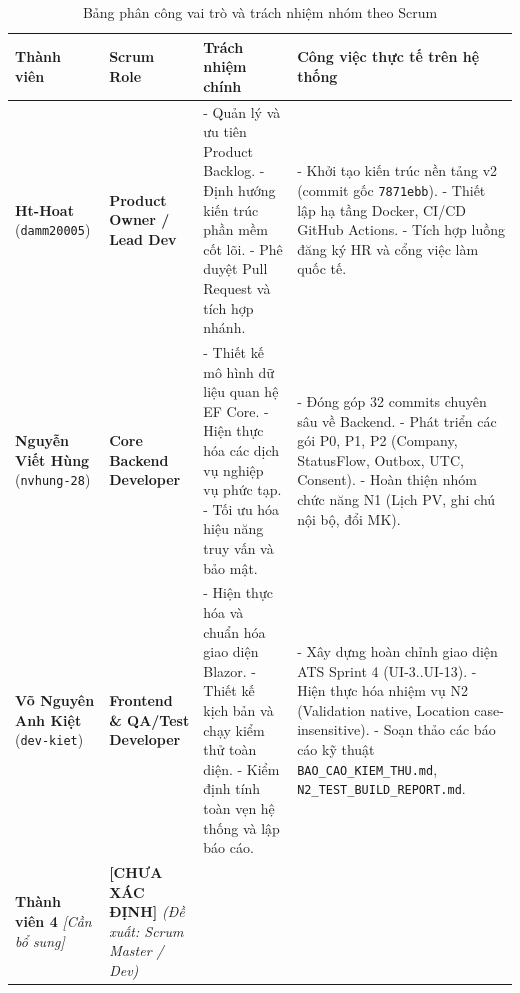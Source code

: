 \begin{table}[htbp]
\centering
\small
\caption{Bảng phân công vai trò và trách nhiệm nhóm theo Scrum}
\label{tab:scrum-roles}
\begin{tabularx}{\textwidth}{p{3.2cm} p{2.8cm} X X}
\toprule
\textbf{Thành viên} & \textbf{Scrum Role} & \textbf{Trách nhiệm chính} & \textbf{Công việc thực tế trên hệ thống} \\
\midrule
\textbf{Ht-Hoat} \newline (\texttt{damm20005}) & \textbf{Product Owner / Lead Dev} & 
- Quản lý và ưu tiên Product Backlog.\newline
- Định hướng kiến trúc phần mềm cốt lõi.\newline
- Phê duyệt Pull Request và tích hợp nhánh. &
- Khởi tạo kiến trúc nền tảng v2 (commit gốc \texttt{7871ebb}).\newline
- Thiết lập hạ tầng Docker, CI/CD GitHub Actions.\newline
- Tích hợp luồng đăng ký HR và cổng việc làm quốc tế. \\
\addlinespace
\textbf{Nguyễn Viết Hùng} \newline (\texttt{nvhung-28}) & \textbf{Core Backend Developer} &
- Thiết kế mô hình dữ liệu quan hệ EF Core.\newline
- Hiện thực hóa các dịch vụ nghiệp vụ phức tạp.\newline
- Tối ưu hóa hiệu năng truy vấn và bảo mật. &
- Đóng góp 32 commits chuyên sâu về Backend.\newline
- Phát triển các gói P0, P1, P2 (Company, StatusFlow, Outbox, UTC, Consent).\newline
- Hoàn thiện nhóm chức năng N1 (Lịch PV, ghi chú nội bộ, đổi MK). \\
\addlinespace
\textbf{Võ Nguyên Anh Kiệt} \newline (\texttt{dev-kiet}) & \textbf{Frontend \& QA/Test Developer} &
- Hiện thực hóa và chuẩn hóa giao diện Blazor.\newline
- Thiết kế kịch bản và chạy kiểm thử toàn diện.\newline
- Kiểm định tính toàn vẹn hệ thống và lập báo cáo. &
- Xây dựng hoàn chỉnh giao diện ATS Sprint 4 (UI-3..UI-13).\newline
- Hiện thực hóa nhiệm vụ N2 (Validation native, Location case-insensitive).\newline
- Soạn thảo các báo cáo kỹ thuật \texttt{BAO\_CAO\_KIEM\_THU.md}, \texttt{N2\_TEST\_BUILD\_REPORT.md}. \\
\addlinespace
\textbf{Thành viên 4} \newline \textit{[Cần bổ sung]} & \textbf{[CHƯA XÁC ĐỊNH]} \newline \textit{(Đề xuất: Scrum Master / Dev)} &

\end{tabularx}
\end{table}
